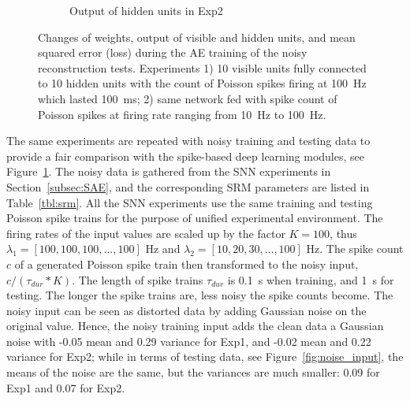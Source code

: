 \begin{figure}
\begin{subfigure}[t]{0.45\textwidth}
		\caption{Output of hidden units in Exp2}
	\end{subfigure}
	\caption{Changes of weights, output of visible and hidden units, and mean squared error (loss) during the AE training of the noisy reconstruction tests. 
		Experiments 1) 10 visible units fully connected to 10 hidden units with the count of Poisson spikes firing at 100~Hz which lasted 100~ms; 2) same network fed with spike count of Poisson spikes at firing rate ranging from 10~Hz to 100~Hz.}
	\label{fig:ae_noise}
\end{figure}

The same experiments are repeated with noisy training and testing data to provide a fair comparison with the spike-based deep learning modules, see Figure~\ref{fig:ae_noise}.
The noisy data is gathered from the SNN experiments in Section~\ref{subsec:SAE}, and the corresponding SRM parameters are listed in Table~\ref{tbl:srm}.
All the SNN experiments use the same training and testing Poisson spike trains for the purpose of unified experimental environment.
The firing rates of the input values are scaled up by the factor $K = 100$, thus $\lambda_1 = [100, 100, 100, ..., 100]$ Hz and $\lambda_2 = [10, 20, 30, ..., 100]$ Hz.
The spike count $c$ of a generated Poisson spike train then transformed to the noisy input, $c/(\tau_{dur} * K)$.
The length of spike trains $\tau_{dur}$ is 0.1~s when training, and 1~s for testing.
The longer the spike trains are, less noisy the spike counts become.
The noisy input can be seen as distorted data by adding Gaussian noise on the original value.
Hence, the noisy training input adds the clean data a Gaussian noise with -0.05 mean and 0.29 variance for Exp1, and -0.02 mean and 0.22 variance for Exp2;
while in terms of testing data, see Figure~\ref{fig:noise_input}, the means of the noise are the same, but the variances are much smaller: 0.09 for Exp1 and 0.07 for Exp2.
